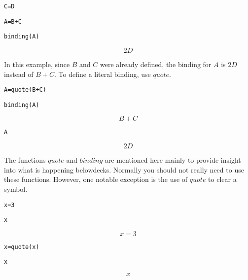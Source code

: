 \verb$C=D$

\verb$A=B+C$

\verb$binding(A)$

$$2D$$

\medskip
\noindent
In this example, since $B$ and $C$ were already defined, the binding for $A$
is $2D$ instead of $B+C$.
To define a literal binding, use $quote$.

\medskip
\verb$A=quote(B+C)$

\verb$binding(A)$

$$B+C$$

\verb$A$

$$2D$$

\medskip
\noindent
The functions $quote$ and $binding$ are mentioned here mainly to provide insight
into what is happening belowdecks.
Normally you should not really need to use these functions.
However, one notable exception is the use of $quote$ to clear a symbol.

\medskip
\verb$x=3$

\verb$x$

$$x=3$$

\verb$x=quote(x)$

\verb$x$

$$x$$

